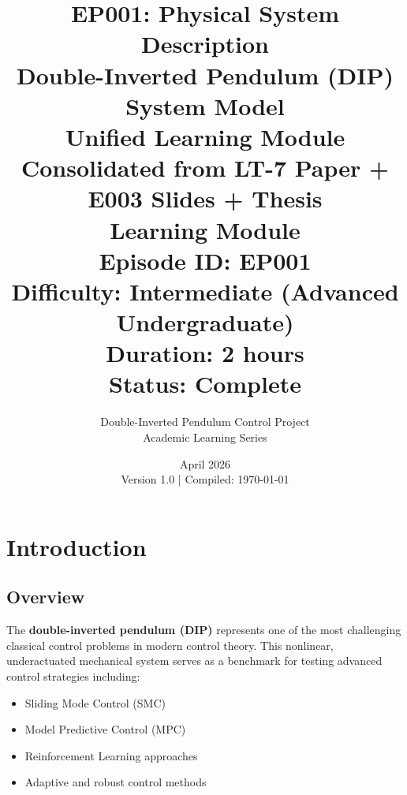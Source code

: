 \documentclass[11pt,a4paper]{article}
\begin{document}
\title{\textbf{\Large EP001: Physical System Description}\\[1em]
\large Double-Inverted Pendulum (DIP) System Model\\[1em]
\large Unified Learning Module\\[2em]
\small Consolidated from LT-7 Paper + E003 Slides + Thesis\\[1em]
\textbf{\large Learning Module}\\[3em]
Episode ID: EP001 \\
Difficulty: Intermediate (Advanced Undergraduate) \\
Duration: 2 hours \\
Status: Complete
}

\author{Double-Inverted Pendulum Control Project\\
Academic Learning Series}

\date{April 2026\\
\small Version 1.0 | Compiled: \today}

\maketitle
\thispagestyle{empty}
\newpage

\tableofcontents
\newpage


\section{Introduction}

\subsection{Overview}

The \textbf{double-inverted pendulum (DIP)} represents one of the most challenging classical control problems in modern control theory. This nonlinear, underactuated mechanical system serves as a benchmark for testing advanced control strategies including:

\begin{itemize}
    \item Sliding Mode Control (SMC)
    \item Model Predictive Control (MPC)
    \item Reinforcement Learning approaches
    \item Adaptive and robust control methods
\end{itemize}
\end{document}
